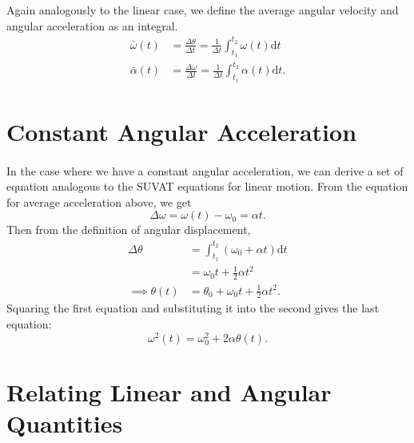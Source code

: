 \documentclass[../newtonian_mechanics.tex]{subfiles}
\begin{document}
        Again analogously to the linear case, we define the average angular velocity and angular acceleration as an integral.
        \begin{align}
            \bar{\omega}(t)&=\frac{\Delta\theta}{\Delta t}=\frac{1}{\Delta t}\int_{t_1}^{t_2}\omega(t)\mathrm{d}t\\
            \bar{\alpha}(t)&=\frac{\Delta\omega}{\Delta t}=\frac{1}{\Delta t}\int_{t_1}^{t_2}\alpha(t)\mathrm{d}t.
        \end{align}

    \section{Constant Angular Acceleration}
        \paragraph{}
        In the case where we have a constant angular acceleration, we can derive a set of equation analogous to the SUVAT equations for linear motion.
        From the equation for average acceleration above, we get
        \begin{equation}
            \Delta\omega=\omega(t)-\omega_0=\alpha t.
        \end{equation}
        Then from the definition of angular displacement,
        \begin{align}
            \Delta\theta&=\int_{t_1}^{t_2}(\omega_0+\alpha t)\mathrm{d}t\\
            &=\omega_0t+\frac{1}{2}\alpha t^2\\
            \implies\theta(t)&=\theta_0+\omega_0t+\frac{1}{2}\alpha t^2.
        \end{align}
        Squaring the first equation and substituting it into the second gives the last equation:
        \begin{equation}
            \omega^2(t)=\omega_0^2+2\alpha\theta(t).
        \end{equation}

    \section{Relating Linear and Angular Quantities}
\end{document}
